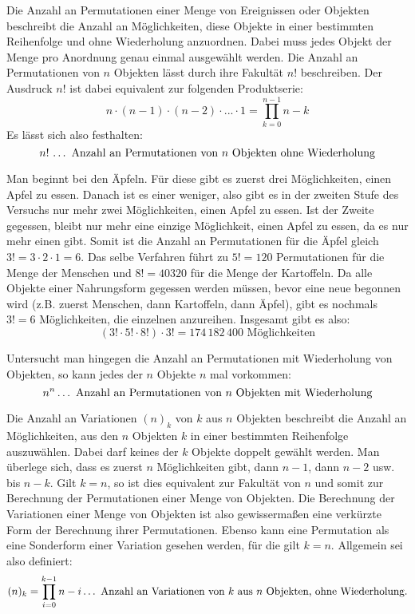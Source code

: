 Die Anzahl an Permutationen einer Menge von Ereignissen oder Objekten beschreibt die Anzahl an M\"{o}glichkeiten, diese Objekte in einer bestimmten Reihenfolge und ohne Wiederholung anzuordnen. Dabei muss jedes Objekt der Menge pro Anordnung genau einmal ausgew\"{a}hlt werden. Die Anzahl an Permutationen von $n$ Objekten l\"{a}sst durch ihre Fakult\"{a}t $n!$ beschreiben. Der Ausdruck $n!$ ist dabei equivalent zur folgenden Produktserie: $$n \cdot (n - 1) \cdot (n - 2) \cdot ... \cdot 1 = \prod_{k=0}^{n - 1} n - k$$ Es l\"{a}sst sich also festhalten: $$n! \, \dots \,\, \text{Anzahl an Permutationen von $n$ Objekten ohne Wiederholung}$$


Man beginnt bei den \"{A}pfeln. F\"{u}r diese gibt es zuerst drei M\"{o}glichkeiten, einen Apfel zu essen. Danach ist es einer weniger, also gibt es in der zweiten Stufe des Versuchs nur mehr zwei M\"{o}glichkeiten, einen Apfel zu essen. Ist der Zweite gegessen, bleibt nur mehr eine einzige M\"{o}glichkeit, einen Apfel zu essen, da es nur mehr einen gibt. Somit ist die Anzahl an Permutationen f\"{u}r die \"{A}pfel gleich $3! = 3 \cdot 2 \cdot 1 = 6$. Das selbe Verfahren f\"{u}hrt zu $5! = 120$ Permutationen f\"{u}r die Menge der Menschen und $8! = 40320$ f\"{u}r die Menge der Kartoffeln. Da alle Objekte einer Nahrungsform gegessen werden m\"{u}ssen, bevor eine neue begonnen wird (z.B. zuerst Menschen, dann Kartoffeln, dann \"{A}pfel), gibt es nochmals $3! = 6$ M\"{o}glichkeiten, die einzelnen  anzureihen. Insgesamt gibt es also: $$(3! \cdot 5! \cdot 8!) \cdot 3! = 174\,182\,400 \text{ M\"{o}glichkeiten}$$

Untersucht man hingegen die Anzahl an Permutationen mit Wiederholung von Objekten, so kann jedes der $n$ Objekte $n$ mal vorkommen: $$n^n \dots \,\, \text{Anzahl an Permutationen von $n$ Objekten mit Wiederholung}$$


Die Anzahl an Variationen $(n)_k$ von $k$ aus $n$ Objekten beschreibt die Anzahl an M\"{o}glichkeiten, aus den $n$ Objekten $k$ in einer bestimmten Reihenfolge auszuw\"{a}hlen. Dabei darf keines der $k$ Objekte doppelt gew\"{a}hlt werden. Man \"{u}berlege sich, dass es zuerst $n$ M\"{o}glichkeiten gibt, dann $n-1$, dann $n-2$ usw. bis $n-k$. Gilt $k = n$, so ist dies equivalent zur Fakult\"{a}t von $n$ und somit zur Berechnung der Permutationen einer Menge von Objekten. Die Berechnung der Variationen einer Menge von Objekten ist also gewisserma\ss{}en eine verk\"{u}rzte Form der Berechnung ihrer Permutationen. Ebenso kann eine Permutation als eine Sonderform einer Variation gesehen werden, f\"{u}r die gilt $k = n$. Allgemein sei also definiert: $$(n)_k = \prod_{i=0}^{k-1} n - i \dots \,\, \text{Anzahl an Variationen von $k$ aus $n$ Objekten, ohne Wiederholung.} $$

